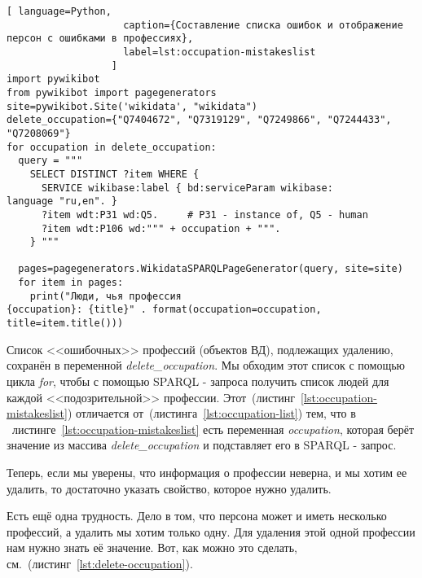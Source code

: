 \begin{lstlisting}[ language=Python,
                    caption={Составление списка ошибок и отображение персон с ошибками в профессиях},
                    label=lst:occupation-mistakeslist
                  ]
import pywikibot
from pywikibot import pagegenerators
site=pywikibot.Site('wikidata', "wikidata")
delete_occupation={"Q7404672", "Q7319129", "Q7249866", "Q7244433", 
"Q7208069"}
for occupation in delete_occupation:
  query = """
    SELECT DISTINCT ?item WHERE {
      SERVICE wikibase:label { bd:serviceParam wikibase:
language "ru,en". }
      ?item wdt:P31 wd:Q5.     # P31 - instance of, Q5 - human
      ?item wdt:P106 wd:""" + occupation + """.
    } """

  pages=pagegenerators.WikidataSPARQLPageGenerator(query, site=site)
  for item in pages:
    print("Люди, чья профессия 
{occupation}: {title}" . format(occupation=occupation, 
title=item.title()))
\end{lstlisting} 

Список <<ошибочных>> профессий (объектов ВД), подлежащих удалению, сохранён в переменной \textit{delete\_occupation}. Мы обходим этот список с помощью цикла \textit{for}, чтобы с помощью SPARQL - запроса получить список людей для каждой <<подозрительной>> профессии. Этот~(листинг~\ref{lst:occupation-mistakeslist}) отличается от~(листинга~\ref{lst:occupation-list}) тем, что в ~листинге~\ref{lst:occupation-mistakeslist} есть переменная \textit{occupation}, которая берёт значение из массива \textit{delete\_occupation} и подставляет его в SPARQL - запрос.

Теперь, если мы уверены, что информация о профессии неверна, и мы хотим ее удалить, то достаточно указать свойство, которое нужно удалить.

Есть ещё одна трудность. Дело в том, что персона может и иметь несколько профессий, а удалить мы хотим только одну. Для удаления этой одной профессии нам нужно знать её значение. Вот, как можно это сделать, см.~(листинг~\ref{lst:delete-occupation}). 

